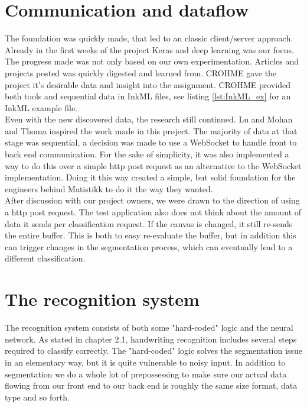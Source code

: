 \section{Communication and dataflow}
The foundation was quickly made, that led to an classic client/server approach. Already in the first weeks of the project Keras and deep learning was our focus.%
The progress made was not only based on our own experimentation. Articles and projects posted was quickly digested and learned from. CROHME gave the project it's desirable data and insight into the assignment. CROHME provided both tools and  sequential data in InkML files, see listing \ref{lst:InkML_ex} for an InkML example file.\\
Even with the new discovered data, the research still continued.  Lu and Mohan \cite{lu_recognition_2015} and Thoma \cite{thoma_-line_2015} inspired the work made in this project. The majority of data at that stage was sequential, a decision was made to use a \gls{WebSocket} to handle front to back end communication. For the sake of simplicity, it was also implemented a way to do this over a simple http post request as an alternative to the WebSocket implementation. Doing it this way created a simple, but solid foundation for the engineers behind Matistikk to do it the way they wanted. \\
After discussion with our project owners, we were drawn to the direction of using a http post request. The test application also does not think about the amount of data it sends per classification request. If the canvas is changed, it still re-sends the entire buffer. This is both to easy re-evaluate the buffer, but in addition this can trigger changes in the segmentation process, which can eventually lead to a different classification.

\section{The recognition system} %
The recognition system consists of both some "hard-coded" logic and the neural network. As stated in chapter 2.1, handwriting recognition includes several steps required to classify correctly. The "hard-coded" logic solves the segmentation issue in an elementary way, but it is quite vulnerable to noisy input. In addition to segmentation we do a whole lot of prepossessing to make sure our actual data flowing from our front end to our back end is roughly the same size format, data type and so forth. %

